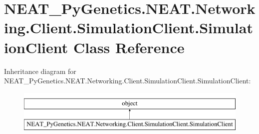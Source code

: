 \hypertarget{classNEAT__PyGenetics_1_1NEAT_1_1Networking_1_1Client_1_1SimulationClient_1_1SimulationClient}{}\section{N\+E\+A\+T\+\_\+\+Py\+Genetics.\+N\+E\+A\+T.\+Networking.\+Client.\+Simulation\+Client.\+Simulation\+Client Class Reference}
\label{classNEAT__PyGenetics_1_1NEAT_1_1Networking_1_1Client_1_1SimulationClient_1_1SimulationClient}
Inheritance diagram for N\+E\+A\+T\+\_\+\+Py\+Genetics.\+N\+E\+A\+T.\+Networking.\+Client.\+Simulation\+Client.\+Simulation\+Client\+:\begin{figure}[H]
\begin{center}
\leavevmode
\includegraphics[height=2.000000cm]{classNEAT__PyGenetics_1_1NEAT_1_1Networking_1_1Client_1_1SimulationClient_1_1SimulationClient}
\end{center}
\end{figure}
